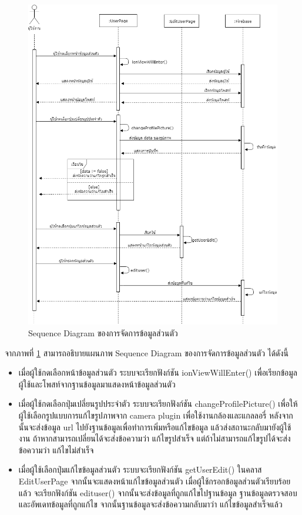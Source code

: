 \begin{figure}[H]
	\centering
	\includegraphics[width=1.1\columnwidth]
	{Figures/3/Sequence/edituser}
	\caption{Sequence Diagram ของการจัดการข้อมูลส่วนตัว}
	\label{Fig:Sequence-edituser}
\end{figure}
\newpage

จากภาพที่ \ref{Fig:Sequence-edituser} สามารถอธิบายแผนภาพ Sequence Diagram ของการจัดการข้อมูลส่วนตัว ได้ดังนี้ 
\begin{itemize}
	\item เมื่อผู้ใช้กดเลือกหน้าข้อมูลส่วนตัว ระบบจะเรียกฟังก์ชัน ionViewWillEnter() เพื่อเรียกข้อมูลผู้ใช้และโพสท์จากฐานข้อมูลมาแสดงหน้าข้อมูลส่วนตัว
	\item เมื่อผู้ใช้กดเลือกปุ่มเปลี่ยนรูปประจำตัว ระบบจะเรียกฟังก์ชัน changeProfilePicture() เพื่อให้ผู้ใช้เลือกรูปแบบการแก้ไขรูปภาพจาก camera plugin เพื่อใช้งานกล้องและแกลลอรี่ 
	หลังจากนั้นจะส่งข้อมูล url ไปยังฐานข้อมูลเพื่อทำการเพิ่มหรือแก้ไขข้อมูล แล้วส่งสถานะกลับมายังผู้ใช้งาน ถ้าหากสามารถเปลี่ยนได้จะส่งข้อความว่า แก้ไขรูปสำเร็จ 
	แต่ถ้าไม่สามารถแก้ไขรูปได้จะส่งข้อความว่า แก้ไขไม่สำเร็จ 
	\item เมื่อผู้ใช้เลือกปุ่มแก้ไขข้อมูลส่วนตัว ระบบจะเรียกฟังก์ชัน getUserEdit() ในคลาส EditUserPage จากนั้นจะแสดงหน้าแก้ไขข้อมูลส่วนตัว เมื่อผู้ใช้กรอกข้อมูลส่วนตัวเรียบร้อยแล้ว จะเรียกฟังก์ชัน edituser() 
	จากนั้นจะส่งข้อมูลที่ถูกแก้ไขไปฐานข้อมูล ฐานข้อมูลตรวจสอบและอัพเดทข้อมูลที่ถูกแก้ไข จากนั้นฐานข้อมูลจะส่งข้อความกลับมาว่า แก้ไขข้อมูลสำเร็จแล้ว
	\end{itemize}


